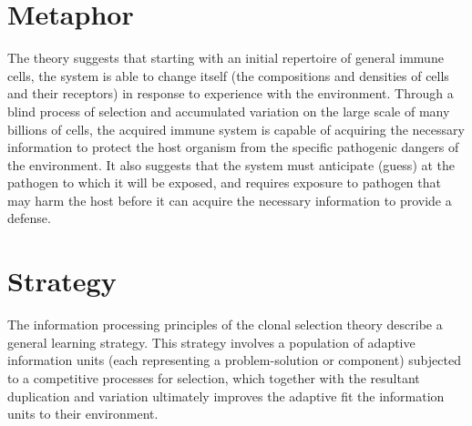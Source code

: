 \documentclass[a4paper, 11pt]{article}
\begin{document}
\section{Metaphor}
\label{sec:metaphor}
The theory suggests that starting with an initial repertoire of general immune cells, the system is able to change itself (the compositions and densities of cells and their receptors) in response to experience with the environment. Through a blind process of selection and accumulated variation on the large scale of many billions of cells, the acquired immune system is capable of acquiring the necessary information to protect the host organism from the specific pathogenic dangers of the environment. It also suggests that the system must anticipate (guess) at the pathogen to which it will be exposed, and requires exposure to pathogen that may harm the host before it can acquire the necessary information to provide a defense.

\section{Strategy}
\label{sec:strategy}
The information processing principles of the clonal selection theory describe a general learning strategy.
This strategy involves a population of adaptive information units (each representing a problem-solution or component) subjected to a competitive processes for selection, which together with the resultant duplication and variation ultimately improves the adaptive fit the information units to their environment.

\end{document}
